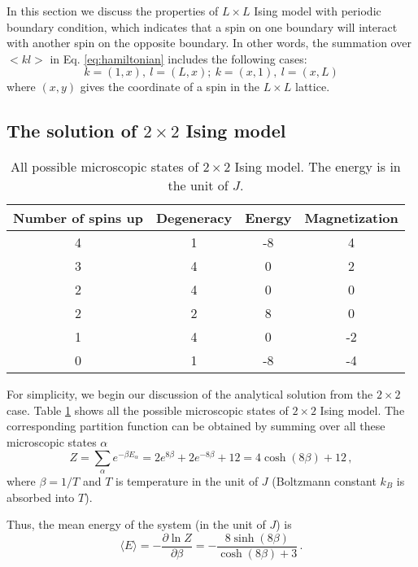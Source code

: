 In this section we discuss the properties of $L \times L$ Ising model with periodic boundary condition, 
which indicates that a spin on one boundary will interact with another spin on the opposite boundary. 
In other words, the summation over $<kl>$ in Eq. \ref{eq:hamiltonian} includes the following cases: 
\begin{equation}
k=(1,x),\ l=(L,x);\ k=(x,1),\ l=(x,L)
\end{equation}
where $(x,y)$ gives the coordinate of a spin in the $L \times L$ lattice. 

\subsection{The solution of $2 \times 2$ Ising model}\label{sec:2times2}
\begin{table}[tb]
	\centering
	\caption{All possible microscopic states of $2 \times 2$ Ising model. The energy is in the unit of $J$. }
	\begin{tabular}{cccc}
		\hline
		\hline 
		Number of spins up & Degeneracy & Energy & Magnetization \\ 
		\hline
		4 & 1 & -8 & 4 \\  
		3 & 4 & 0 & 2 \\ 
		2 & 4 & 0 & 0 \\ 
		2 & 2 & 8 & 0 \\ 
		1 & 4 & 0 & -2 \\ 
		0 & 1 & -8 & -4 \\ 
		\hline 
		\hline
	\end{tabular}
	\label{tab:2times2} 
\end{table}
For simplicity, we begin our discussion of the analytical solution from the $2 \times 2$ case. 
Table \ref{tab:2times2} shows all the possible microscopic states of  $2 \times 2$ Ising model. 
The corresponding partition function can be obtained by summing over all these microscopic states $\alpha$ 
\begin{equation}
Z=\sum_{\alpha}e^{-\beta E_\alpha}=2e^{8\beta}+2e^{-8\beta}+12=4\cosh\left(8\beta\right)+12\,,
\end{equation}
where $\beta=1/T$ and $T$ is temperature in the unit of $J$ (Boltzmann constant $k_B$ is absorbed into $T$). 
\par
Thus, the mean energy of the system (in the unit of $J$) is 
\begin{equation}
\langle E\rangle=-\frac{\partial \ln Z}{\partial \beta}=-\frac{8\sinh\left(8\beta\right)}{\cosh\left(8\beta\right)+3}\,. 
\end{equation}
